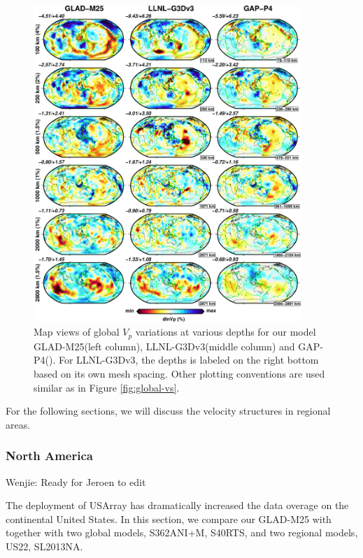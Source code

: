\documentclass[extra,mreferee]{gji}
\begin{document}
\begin{figure}
\includegraphics[width=0.9\textwidth]{figures/depth_slice/globe_vp_LLNL-GAP.pdf}
  \caption{Map views of global $V_p$ variations at various depths for our model
  GLAD-M25(left column), LLNL-G3Dv3(middle column) \citep{simmons2012llnl} and
  GAP-P4(\citep{fukao2013subducted}).
  For LLNL-G3Dv3, the depths is labeled on the right
  bottom based on its own mesh spacing. Other plotting conventions are used
  similar as in Figure \ref{fig:global-vs}.}
\label{fig:global-vp}
\centering
\end{figure}

For the following sections, we will discuss the velocity structures in regional
areas.

\subsubsection{North America}

{\color{Red} Wenjie: Ready for Jeroen to edit}

The deployment of USArray has dramatically increased the data overage on the
continental United States. In this section, we compare our GLAD-M25 with
together with two global models, S362ANI+M, S40RTS, and two regional models,
US22\citep{zhu2017radial}, SL2013NA\citep{schaeffer2014imaging}.
\end{document}
